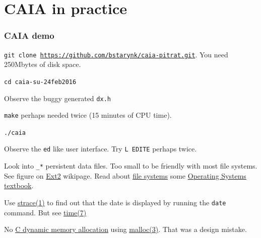 \documentclass[xcolor=svgnames,final,smaller,a4]{beamer}
\begin{document}

 \section{CAIA in practice}

 \begin{frame}
   \frametitle{CAIA demo}

   \texttt{git clone
     \href{https://github.com/bstarynk/caia-pitrat.git}{https://github.com/bstarynk/caia-pitrat.git}}. You
   need 250Mbytes of disk space.

   \texttt{cd caia-su-24feb2016}
   
Observe the buggy generated \texttt{dx.h} 

   \texttt{make} perhaps needed twice (15 minutes of CPU time).

   \texttt{./caia}

   Observe the \texttt{ed} like user interface. Try \texttt{L EDITE} perhaps twice.
    
   Look into \texttt{\_*} persistent data files. Too small to be
   friendly with most file systems. See figure on
   \href{https://en.wikipedia.org/wiki/Ext2}{Ext2} wikipage. Read
   about \href{https://en.wikipedia.org/wiki/File_system}{file
     systems} some
   \href{http://pages.cs.wisc.edu/~remzi/OSTEP/}{Operating Systems
     textbook}.

   Use
   \href{http://man7.org/linux/man-pages/man1/strace.1.html}{strace(1)}
   to find out that the date is displayed by running the \texttt{date}
   command. But see
   \href{http://man7.org/linux/man-pages/man7/time.7.html}{time(7)}

   No
   \href{https://en.wikipedia.org/wiki/C_dynamic_memory_allocation}{C
     dynamic memory allocation} using
   \href{http://man7.org/linux/man-pages/man3/malloc.3.html}{malloc(3)}. That
   was a design mistake.
   
 \end{frame}
 
\end{document}
